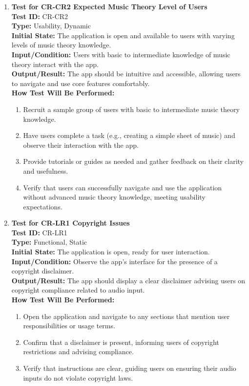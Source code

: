 \documentclass[12pt, titlepage]{article}
\begin{document}
\begin{enumerate}
    \item \textbf{Test for CR-CR2 Expected Music Theory Level of Users} \\
      \newline
      \textbf{Test ID:} CR-CR2 \\
      \textbf{Type:} Usability, Dynamic \\
      \textbf{Initial State:} The application is open and available to users with varying levels of music theory knowledge. \\
      \textbf{Input/Condition:} Users with basic to intermediate knowledge of music theory interact with the app. \\
      \textbf{Output/Result:} The app should be intuitive and accessible, allowing users to navigate and use core features comfortably. \\
      \textbf{How Test Will Be Performed:}
      \begin{enumerate}
          \item Recruit a sample group of users with basic to intermediate music theory knowledge.
          \item Have users complete a task (e.g., creating a simple sheet of music) and observe their interaction with the app.
          \item Provide tutorials or guides as needed and gather feedback on their clarity and usefulness.
          \item Verify that users can successfully navigate and use the application without advanced music theory knowledge, 
          meeting usability expectations.
      \end{enumerate}

    \item \textbf{Test for CR-LR1 Copyright Issues} \\
      \newline
      \textbf{Test ID:} CR-LR1 \\
      \textbf{Type:} Functional, Static \\
      \textbf{Initial State:} The application is open, ready for user interaction. \\
      \textbf{Input/Condition:} Observe the app’s interface for the presence of a copyright disclaimer. \\
      \textbf{Output/Result:} The app should display a clear disclaimer advising users on copyright compliance related to 
      audio input. \\
      \textbf{How Test Will Be Performed:}
      \begin{enumerate}
          \item Open the application and navigate to any sections that mention user responsibilities or usage terms.
          \item Confirm that a disclaimer is present, informing users of copyright restrictions and advising compliance.
          \item Verify that instructions are clear, guiding users on ensuring their audio inputs do not violate copyright laws.
      \end{enumerate}


\end{enumerate}
\end{document}
